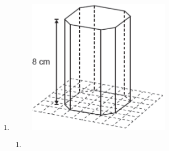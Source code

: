 \documentclass[twocolumn,oneside,a4paper,12.0pt]{article}
\begin{document}
\begin{enumerate}

\item 

	\begin{figure}[!htb]
	\center
	\includegraphics[width=7cm]{Extras/v3.png}
	\end{figure}


\begin{enumerate}
\item 
\end{enumerate}



\end{enumerate}
\end{document}

